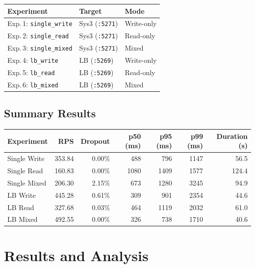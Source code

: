 \documentclass[12pt,a4paper]{article}
\begin{document}
\begin{center}
\begin{tabular}{lll}
\toprule
\textbf{Experiment} & \textbf{Target} & \textbf{Mode} \\
\midrule
Exp.\,1: \texttt{single\_write} & Sys3 (\texttt{:5271}) & Write-only \\
Exp.\,2: \texttt{single\_read}  & Sys3 (\texttt{:5271}) & Read-only  \\
Exp.\,3: \texttt{single\_mixed} & Sys3 (\texttt{:5271}) & Mixed      \\
Exp.\,4: \texttt{lb\_write}     & LB (\texttt{:5269})   & Write-only \\
Exp.\,5: \texttt{lb\_read}      & LB (\texttt{:5269})   & Read-only  \\
Exp.\,6: \texttt{lb\_mixed}     & LB (\texttt{:5269})   & Mixed      \\
\bottomrule
\end{tabular}
\end{center}

\subsection{Summary Results}

\begin{center}
\begin{tabular}{lrrrrrr}
\toprule
\textbf{Experiment} & \textbf{RPS} & \textbf{Dropout} & \textbf{p50 (ms)} & \textbf{p95 (ms)} & \textbf{p99 (ms)} & \textbf{Duration (s)} \\
\midrule
Single Write  & 353.84 & 0.00\% & 488  & 796  & 1147 & 56.5 \\
Single Read   & 160.83 & 0.00\% & 1080 & 1409 & 1577 & 124.4 \\
Single Mixed  & 206.30 & 2.15\% & 673  & 1280 & 3245 & 94.9 \\
LB Write      & 445.28 & 0.61\% & 309  & 901  & 2354 & 44.6 \\
LB Read       & 327.68 & 0.03\% & 464  & 1119 & 2032 & 61.0 \\
LB Mixed      & 492.55 & 0.00\% & 326  & 738  & 1710 & 40.6 \\
\bottomrule
\end{tabular}
\end{center}

\section{Results and Analysis}
\end{document}
